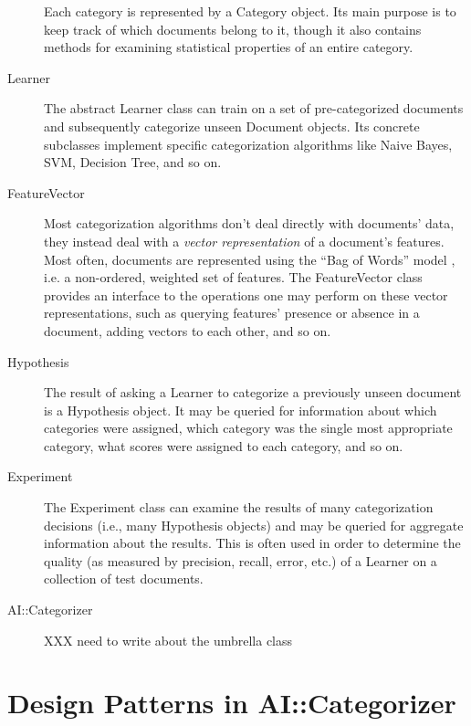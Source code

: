 \documentclass[a4paper]{report}
\begin{document}
\begin{description}
Each category is represented by a Category object.  Its main purpose
is to keep track of which documents belong to it, though it also
contains methods for examining statistical properties of an entire
category.

\item[Learner]

The abstract Learner class can train on a set of pre-categorized
documents and subsequently categorize unseen Document objects.  Its
concrete subclasses implement specific categorization algorithms like
Naive Bayes, SVM, Decision Tree, and so on.

\item[FeatureVector]

Most categorization algorithms don't deal directly with documents'
data, they instead deal with a \emph{vector representation} of a
document's features.  Most often, documents are represented using the
``Bag of Words'' model \cite{XXX}, i.e. a non-ordered, weighted set of
features.  The FeatureVector class provides an interface to the
operations one may perform on these vector representations, such as
querying features' presence or absence in a document, adding vectors
to each other, and so on.

\item[Hypothesis]

The result of asking a Learner to categorize a previously unseen
document is a Hypothesis object.  It may be queried for information
about which categories were assigned, which category was the single
most appropriate category, what scores were assigned to each category,
and so on.

\item[Experiment]

The Experiment class can examine the results of many categorization
decisions (i.e., many Hypothesis objects) and may be queried for
aggregate information about the results.  This is often used in order
to determine the quality (as measured by precision, recall, error,
etc.) of a Learner on a collection of test documents.

\item[AI::Categorizer]

XXX need to write about the umbrella class

\end{description}

\section{Design Patterns in AI::Categorizer}
\end{document}

